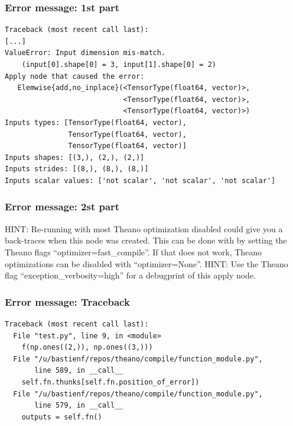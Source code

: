 \documentclass[utf8x,xcolor=pdftex,dvipsnames,table]{beamer}
\begin{document}
\begin{frame}[fragile]
  \frametitle{Error message: 1st part}

\begin{lstlisting}
Traceback (most recent call last):
[...]
ValueError: Input dimension mis-match.
    (input[0].shape[0] = 3, input[1].shape[0] = 2)
Apply node that caused the error:
   Elemwise{add,no_inplace}(<TensorType(float64, vector)>,
                            <TensorType(float64, vector)>,
                            <TensorType(float64, vector)>)
Inputs types: [TensorType(float64, vector),
               TensorType(float64, vector),
               TensorType(float64, vector)]
Inputs shapes: [(3,), (2,), (2,)]
Inputs strides: [(8,), (8,), (8,)]
Inputs scalar values: ['not scalar', 'not scalar', 'not scalar']
\end{lstlisting}
\end{frame}

\begin{frame}[fragile]
  \frametitle{Error message: 2st part}
HINT: Re-running with most Theano optimization
disabled could give you a back-traces when this
node was created. This can be done with by setting
the Theano flags ``optimizer=fast\_compile''. If that does not
work, Theano optimizations can be disabled with
``optimizer=None''.\newline
HINT: Use the Theano flag ``exception\_verbosity=high''
for a debugprint of this apply node.
\end{frame}


\begin{frame}[fragile]
  \frametitle{Error message: Traceback}

\begin{lstlisting}
Traceback (most recent call last):
  File "test.py", line 9, in <module>
    f(np.ones((2,)), np.ones((3,)))
  File "/u/bastienf/repos/theano/compile/function_module.py",
       line 589, in __call__
    self.fn.thunks[self.fn.position_of_error])
  File "/u/bastienf/repos/theano/compile/function_module.py",
       line 579, in __call__
    outputs = self.fn()
\end{lstlisting}
\end{frame}
\end{document}
